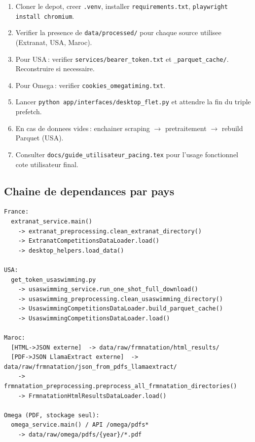 \documentclass[11pt,a4paper]{article}
\begin{document}
\begin{enumerate}
  \item Cloner le depot, creer \texttt{.venv}, installer \texttt{requirements.txt}, \texttt{playwright install chromium}.
  \item Verifier la presence de \texttt{data/processed/} pour chaque source utilisee (Extranat, USA, Maroc).
  \item Pour USA\,: verifier \texttt{services/bearer\_token.txt} et \texttt{\_parquet\_cache/}. Reconstruire si necessaire.
  \item Pour Omega\,: verifier \texttt{cookies\_omegatiming.txt}.
  \item Lancer \texttt{python app/interfaces/desktop\_flet.py} et attendre la fin du triple prefetch.
  \item En cas de donnees vides\,: enchainer scraping $\rightarrow$ pretraitement $\rightarrow$ rebuild Parquet (USA).
  \item Consulter \texttt{docs/guide\_utilisateur\_pacing.tex} pour l'usage fonctionnel cote utilisateur final.
\end{enumerate}

\subsection{Chaine de dependances par pays}

\begin{lstlisting}
France:
  extranat_service.main()
    -> extranat_preprocessing.clean_extranat_directory()
    -> ExtranatCompetitionsDataLoader.load()
    -> desktop_helpers.load_data()

USA:
  get_token_usaswimming.py
    -> usaswimming_service.run_one_shot_full_download()
    -> usaswimming_preprocessing.clean_usaswimming_directory()
    -> UsaswimmingCompetitionsDataLoader.build_parquet_cache()
    -> UsaswimmingCompetitionsDataLoader.load()

Maroc:
  [HTML->JSON externe]  -> data/raw/frmnatation/html_results/
  [PDF->JSON LlamaExtract externe]  -> data/raw/frmnatation/json_from_pdfs_llamaextract/
    -> frmnatation_preprocessing.preprocess_all_frmnatation_directories()
    -> FrmnatationHtmlResultsDataLoader.load()

Omega (PDF, stockage seul):
  omega_service.main() / API /omega/pdfs*
    -> data/raw/omega/pdfs/{year}/*.pdf
\end{lstlisting}

\end{document}
